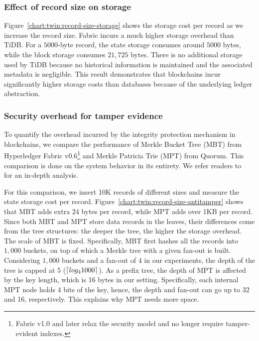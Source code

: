  \subsubsection{Effect of record size on storage}

Figure~\ref{chart:twin:record-size-storage} shows the storage cost per record as we
increase the record size.
Fabric incurs a much higher storage overhead than TiDB.
For a $5000$-byte record, the state storage consumes around $5000$ bytes, while
the block storage consumes $21,725$ bytes.
There is no additional storage used by TiDB because no historical information is
maintained and the associated metadata is negligible.
This result demonstrates that blockchains incur significantly higher storage
costs than databases because of the underlying ledger abstraction.

\subsubsection{Security overhead for tamper evidence}
\label{sec:twin:exp:storage:tamper}

To quantify the overhead incurred by the integrity protection mechanism in
blockchains, we compare the performance of Merkle Bucket Tree (MBT) from
Hyperledger Fabric v0.6\footnote{Fabric v1.0 and later relax the security model
and no longer require tamper-evident indexes.} and Merkle Patricia Trie (MPT)
from Quorum.
This comparison is done on the system behavior in its entirety. We
refer readers to~\cite{yue2020analysis} for an in-depth analysis.

For this comparison, we insert 10K records of different sizes and measure the
state storage cost per record. 
Figure~\ref{chart:twin:record-size-antitamper} shows
that MBT adds extra $24$ bytes per record, while MPT adds over 1KB per record.
Since both MBT and MPT store data records in the leaves, their differences come
from the tree structures: the deeper the tree, the higher the storage overhead.
The scale of MBT is fixed.
Specifically, MBT first hashes all the records into $1,000$ buckets, on top of
which a Merkle tree with a given fan-out is built.
Considering $1,000$ buckets and a fan-out of $4$ in our experiments, the depth
of the tree is capped at 5 ($\lceil log_4 1000\rceil$).
As a prefix tree, the depth of MPT is affected by the key length, which is 16
bytes in our setting.
Specifically, each internal MPT node holds 4 bits of the key, hence, the depth
and fan-out can go up to 32 and 16, respectively.
This explains why MPT needs more space.

